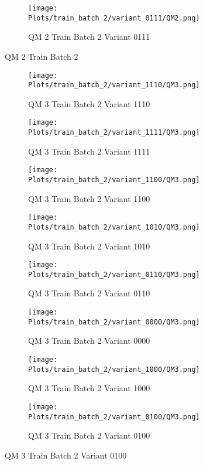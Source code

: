 \documentclass{DissertateFigs}
\begin{document}
\begin{figure}[t!]
\medskip

    \begin{subfigure}{0.47\textwidth}
    \texttt{[image: Plots/train\_batch\_2/variant\_0111/QM2.png]}
    \caption{QM 2 Train Batch 2 Variant 0111}
    \end{subfigure}
\caption{QM 2 Train Batch 2}
    \end{figure}
\clearpage
\begin{figure}[t!]
    \begin{subfigure}{0.47\textwidth}
    \texttt{[image: Plots/train\_batch\_2/variant\_1110/QM3.png]}
    \caption{QM 3 Train Batch 2 Variant 1110}
    \end{subfigure}
    \begin{subfigure}{0.47\textwidth}
    \texttt{[image: Plots/train\_batch\_2/variant\_1111/QM3.png]}
    \caption{QM 3 Train Batch 2 Variant 1111}
    \end{subfigure}

\medskip

    \begin{subfigure}{0.47\textwidth}
    \texttt{[image: Plots/train\_batch\_2/variant\_1100/QM3.png]}
    \caption{QM 3 Train Batch 2 Variant 1100}
    \end{subfigure}
    \begin{subfigure}{0.47\textwidth}
    \texttt{[image: Plots/train\_batch\_2/variant\_1010/QM3.png]}
    \caption{QM 3 Train Batch 2 Variant 1010}
    \end{subfigure}

\medskip

    \begin{subfigure}{0.47\textwidth}
    \texttt{[image: Plots/train\_batch\_2/variant\_0110/QM3.png]}
    \caption{QM 3 Train Batch 2 Variant 0110}
    \end{subfigure}
    \begin{subfigure}{0.47\textwidth}
    \texttt{[image: Plots/train\_batch\_2/variant\_0000/QM3.png]}
    \caption{QM 3 Train Batch 2 Variant 0000}
    \end{subfigure}

\medskip

    \begin{subfigure}{0.47\textwidth}
    \texttt{[image: Plots/train\_batch\_2/variant\_1000/QM3.png]}
    \caption{QM 3 Train Batch 2 Variant 1000}
    \end{subfigure}
    \begin{subfigure}{0.47\textwidth}
    \texttt{[image: Plots/train\_batch\_2/variant\_0100/QM3.png]}
    \caption{QM 3 Train Batch 2 Variant 0100}
    \end{subfigure}


\end{figure}
\end{document}
